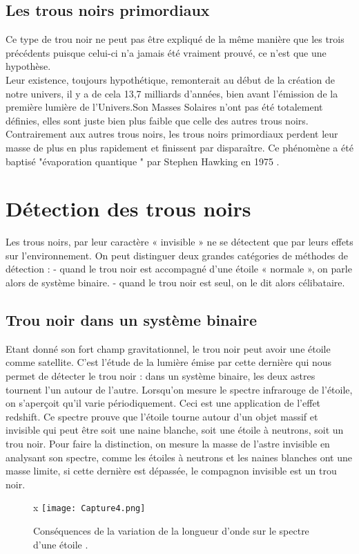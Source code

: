 \documentclass[12pt,  a4paper, openright]{report} %
\begin{document}
	\subsection{ Les trous noirs primordiaux } 
	Ce type de trou noir ne peut pas être expliqué de la même manière que les trois précédents puisque celui-ci n'a jamais été vraiment prouvé, ce n'est que une hypothèse.\\ 
	Leur existence, toujours hypothétique, remonterait au début de la création de notre univers, il y a de cela 13,7 milliards d'années, bien avant l’émission de la première lumière de l'Univers.Son Masses Solaires n'ont pas été totalement définies, elles sont juste bien plus faible que celle des autres trous noirs.\\
Contrairement aux autres trous noirs, les trous noirs primordiaux perdent leur masse
de plus en plus rapidement et finissent par disparaître. Ce phénomène a été baptisé "évaporation quantique " par Stephen Hawking en 1975 \cite{4}.
	\section{Détection des trous noirs } 
	Les trous noirs, par leur caractère « invisible » ne se détectent que par leurs effets sur l’environnement. On peut distinguer deux grandes catégories de méthodes de détection :
	- quand le trou noir est accompagné d’une étoile « normale », on parle alors	
	de système binaire.
	- quand le trou noir est seul, on le dit alors célibataire.	
	\subsection{ Trou noir dans un système binaire }
	Etant donné son fort champ gravitationnel, le trou noir peut avoir une étoile comme satellite. C’est l’étude de la lumière émise par cette dernière qui nous permet de détecter le trou noir : dans un système binaire, les deux astres tournent l’un autour de l’autre. Lorsqu’on mesure le spectre infrarouge de l’étoile, on s’aperçoit qu’il varie périodiquement. Ceci est une application de l’effet redshift.
	Ce spectre prouve que l’étoile tourne autour d’un objet massif et invisible qui peut être soit une naine blanche, soit une étoile à neutrons, soit un trou noir. Pour faire la distinction, on mesure la masse de l’astre invisible en analysant son spectre, comme les étoiles à neutrons et les naines blanches ont une masse limite, si cette dernière est dépassée, le compagnon invisible est un trou noir.\\
	\begin{figure}[H]
		\begin{center}
			\centering
x
		\texttt{[image: Capture4.png]}
\caption{Conséquences de la variation de la longueur d'onde sur le spectre d'une étoile .}

	\end{center}
\end{figure}
\end{document}
